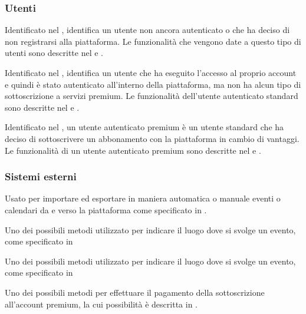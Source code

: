 \begin{listaPersonale}[ACO]{}
    \subsubsection*{Utenti}
    Identificato nel , identifica un utente non ancora autenticato o che ha deciso di non registrarsi alla piattaforma. Le funzionalità che vengono date a questo tipo di utenti sono descritte nel  e .

    Identificato nel , identifica un utente che ha eseguito l'accesso al proprio account e quindi è stato autenticato all'interno della piattaforma, ma non ha alcun tipo di sottoscrizione a servizi premium. Le funzionalità dell'utente autenticato standard sono descritte nel  e .

    Identificato nel , un utente autenticato premium è un utente standard che ha deciso di sottoscrivere un abbonamento con la piattaforma in cambio di vantaggi. Le funzionalità di un utente autenticato premium sono descritte nel  e .

    \subsubsection*{Sistemi esterni}
    Usato per importare ed esportare in maniera automatica o manuale eventi o calendari da e verso la piattaforma come specificato in .

    Uno dei possibili metodi utilizzato per indicare il luogo dove si svolge un evento, come specificato in 


    Uno dei possibili metodi utilizzato per indicare il luogo dove si svolge un evento, come specificato in 

    Uno dei possibili metodi per effettuare il pagamento della sottoscrizione all'account premium, la cui possibilità è descritta in .


\end{listaPersonale}
